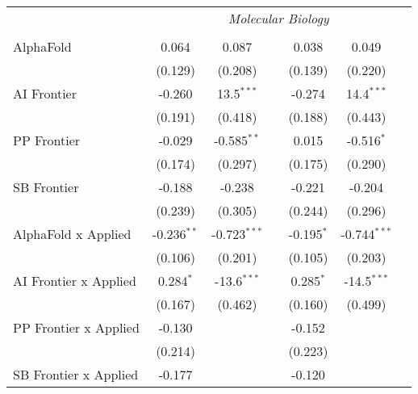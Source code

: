\begin{tabular}{lcccccc}
 & \multicolumn{6}{c}{\textit{Molecular Biology}} \\ \\
   AlphaFold                      & 0.064         & 0.087          &               & 0.038        & 0.049          &   \\   
                                  & (0.129)       & (0.208)        &               & (0.139)      & (0.220)        &   \\   
   AI Frontier                    & -0.260        & 13.5$^{***}$   &               & -0.274       & 14.4$^{***}$   &   \\   
                                  & (0.191)       & (0.418)        &               & (0.188)      & (0.443)        &   \\   
   PP Frontier                    & -0.029        & -0.585$^{**}$  &               & 0.015        & -0.516$^{*}$   &   \\   
                                  & (0.174)       & (0.297)        &               & (0.175)      & (0.290)        &   \\   
   SB Frontier                    & -0.188        & -0.238         &               & -0.221       & -0.204         &   \\   
                                  & (0.239)       & (0.305)        &               & (0.244)      & (0.296)        &   \\   
   AlphaFold x Applied            & -0.236$^{**}$ & -0.723$^{***}$ &               & -0.195$^{*}$ & -0.744$^{***}$ &   \\   
                                  & (0.106)       & (0.201)        &               & (0.105)      & (0.203)        &   \\   
   AI Frontier x Applied          & 0.284$^{*}$   & -13.6$^{***}$  &               & 0.285$^{*}$  & -14.5$^{***}$  &   \\   
                                  & (0.167)       & (0.462)        &               & (0.160)      & (0.499)        &   \\   
   PP Frontier x Applied          & -0.130        &                &               & -0.152       &                &   \\   
                                  & (0.214)       &                &               & (0.223)      &                &   \\   
   SB Frontier x Applied          & -0.177        &                &               & -0.120       &                &   \\   

\end{tabular}
